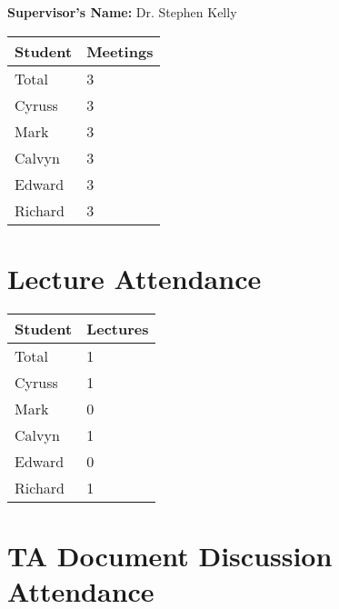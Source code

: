 \documentclass{article}
\begin{document}
\noindent \textbf{Supervisor's Name: } Dr. Stephen Kelly

\begin{table}[H]
\centering
\begin{tabular}{ll}
\toprule
\textbf{Student} & \textbf{Meetings}\\
\midrule
Total & 3\\
Cyruss & 3\\
Mark & 3\\
Calvyn & 3\\
Edward & 3\\
Richard & 3\\
\bottomrule
\end{tabular}
\end{table}


\section{Lecture Attendance}


\begin{table}[H]
\centering
\begin{tabular}{ll}
\toprule
\textbf{Student} & \textbf{Lectures}\\
\midrule
Total & 1\\
Cyruss & 1\\
Mark & 0\\
Calvyn & 1\\
Edward & 0\\
Richard & 1\\
\bottomrule
\end{tabular}
\end{table}


\section{TA Document Discussion Attendance}
\end{document}
